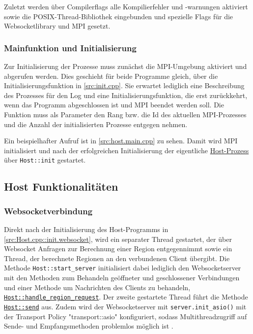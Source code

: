Zuletzt werden über Compilerflags alle Kompilierfehler und -warnungen aktiviert sowie die POSIX-Thread-Bibliothek eingebunden
und spezielle Flags für die Websocketlibrary und MPI gesetzt.

\subsubsection{Mainfunktion und Initialisierung}

Zur Initialisierung der Prozesse muss zunächst die MPI-Umgebung aktiviert und abgerufen werden.
Dies geschieht für beide Programme gleich, über die Initialisierungsfunktion in \autoref{src:init.cpp}.
Sie erwartet lediglich eine Beschreibung des Prozesses für den Log und eine Initialisierungsfunktion,
die erst zurückkehrt, wenn das Programm abgeschlossen ist und MPI beendet werden soll.
Die Funktion muss als Parameter den Rang bzw. die Id des aktuellen MPI-Prozesses und die Anzahl der initialisierten
Prozesse entgegen nehmen.

Ein beispielhafter Aufruf ist in \autoref{src:host.main.cpp} zu sehen. Damit wird MPI initialisiert und nach der
erfolgreichen Initialisierung der eigentliche \hyperref[cls:Host]{Host-Prozess} über \verb|Host::init| gestartet.

\begin{figure}[h]
	
\end{figure}

\begin{figure}
	
\end{figure}

\subsection{Host Funktionalitäten} \label{cls:Host}

\subsubsection{Websocketverbindung}

Direkt nach der Initialisierung des Host-Programms in \autoref{src:Host.cpp::init.websocket}, wird ein separater Thread gestartet, der über Websocket
Anfragen zur Berechnung einer Region entgegennimmt sowie ein Thread, der berechnete Regionen an den verbundenen Client übergibt.
Die Methode \verb|Host::start_server| initialisiert dabei lediglich den Websocketserver mit den Methoden zum Behandeln geöffneter und geschlossener Verbindungen und
einer Methode um Nachrichten des Clients zu behandeln, \hyperref[cls:Host::handle_region_request]{\texttt{Host::handle\_region\_request}}.
Der zweite gestartete Thread führt die Methode \hyperref[cls:Host::send]{\texttt{Host::send}} aus.
Zudem wird der Websocketserver mit \verb|server.init_asio()| mit der Transport Policy "transport::asio"
konfiguriert, sodass Multithreadzugriff auf Sende- und Empfangsmethoden problemlos möglich ist \cite{websocketppManual}.

